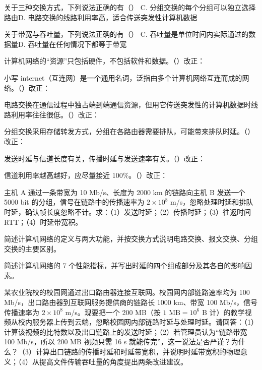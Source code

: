 \documentclass[a4paper,11pt]{article}
\begin{document}
\q 关于三种交换方式，下列说法正确的有（\quad）
{C. 分组交换的每个分组可以独立选择路由}{D. 电路交换的线路利用率高，适合传送突发性计算机数据}

\q 关于带宽与吞吐量，下列说法正确的有（\quad）
{C. 吞吐量是单位时间内实际通过的数据量}{D. 吞吐量在任何情况下都等于带宽}

\q 计算机网络的“资源”只包括硬件，不包括软件和数据。\quad（\quad）\quad 改正：\fixblank

\q 小写 internet（互连网）是一个通用名词，泛指由多个计算机网络互连而成的网络。\quad（\quad）\quad 改正：\fixblank

\q 电路交换在通信过程中独占端到端通信资源，但用它传送突发性的计算机数据时线路利用率往往很低。\quad（\quad）\quad 改正：\fixblank

\q 分组交换采用存储转发方式，分组在各路由器需要排队，可能带来排队时延。\quad（\quad）\quad 改正：\fixblank

\q 发送时延与信道长度有关，传播时延与发送速率有关。\quad（\quad）\quad 改正：\fixblank

\q 信道利用率越高越好，应尽量接近 100\%。\quad（\quad）\quad 改正：\fixblank

\q 主机 A 通过一条带宽为 10 Mb/s、长度为 2000 km 的链路向主机 B 发送一个 5000 bit 的分组，信号在链路中的传播速率为 $2\times10^{8}$ m/s，忽略处理时延和排队时延，确认帧长度忽略不计。求：（1）发送时延；（2）传播时延；（3）往返时间 RTT；（4）时延带宽积。

\q 简述计算机网络的定义与两大功能，并按交换方式说明电路交换、报文交换、分组交换的主要区别。\anslines{2.4cm}

\q 简述计算机网络的 7 个性能指标，并写出时延的四个组成部分及其各自的影响因素。\anslines{2.4cm}

\newpage
{}
\q 某农业院校的校园网通过出口路由器连接互联网。校园网内部链路速率均为 100 Mb/s，出口路由器到互联网服务提供商的链路长 1000 km、带宽 100 Mb/s，信号传播速率为 $2\times10^{8}$ m/s。现要把一个 200 MB（按 $1\text{ MB}=10^{6}$ B 计）的教学视频从校内服务器上传到云端，忽略校园网内部链路时延与处理时延。请回答：（1）计算该视频的比特数以及出口链路上的发送时延；（2）若管理员认为“链路带宽 100 Mb/s，所以 200 MB 视频只需 16 s 就能传完”，这一说法是否严谨？为什么？（3）计算出口链路的传播时延和时延带宽积，并说明时延带宽积的物理意义；（4）从提高文件传输吞吐量的角度提出两条改进建议。\anslines{5cm}
\end{document}

